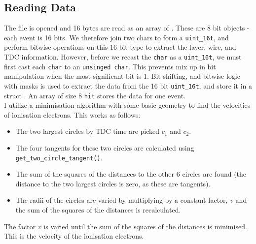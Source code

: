 \documentclass[11pt]{article}
\begin{document}
\subsection{Reading Data}
\label{sec:reading}
The file is opened and 16 bytes are read as an array of . These are 8 bit objects - each event is 16 bits. We therefore join two chars to form a \texttt{uint\_16t}, and perform bitwise operations on this 16 bit type to extract the layer, wire, and TDC information. However, before we recast the \texttt{char} as a \texttt{uint\_16t}, we must first cast each \texttt{char} to an \texttt{unsinged char}. This prevents mix up in bit manipulation when the most significant bit is 1. Bit shifting, and bitwise logic with masks is used to extract the data from the 16 bit \texttt{uint\_16t}, and store it in a struct . An array of size 8 \texttt{hit} stores the data for one event.\\


I utilize a minimisation algorithm with some basic geometry to find the velocities of ionisation electrons. This works as follows:
\begin{itemize}
    \item The two largest circles by TDC time are picked $c_1$ and $c_2$.
    \item The four tangents for these two circles are calculated using \texttt{get\_two\_circle\_tangent()}.
    \item The sum of the squares of the distances to the other 6 circles are found (the distance to the two largest circles is zero, as these are tangents).
    \item The radii of the circles are varied by multiplying by a constant factor, $v$ and the sum of the squares of the distances is recalculated.
\end{itemize}
The factor $v$ is varied until the sum of the squares of the distances is minimised. This is the velocity of the ionisation electrons.
\end{document}

